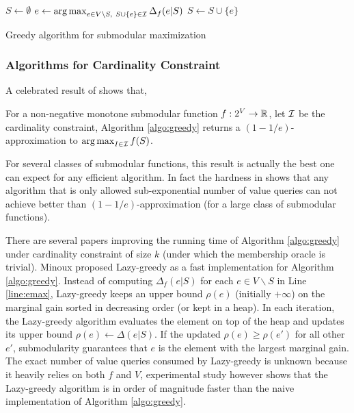 \begin{algorithm}[H]
\DontPrintSemicolon %
$S \gets \emptyset$\;
 {
  $e \gets \operatorname*{arg\,max}_{e\in V\backslash S, ~S\cup\{e\}\in \mathcal{I}} \Delta_f(e|S)$\;\label{line:emax}
  $S \gets S\cup \{e\}$\;
}
\;
\caption{{\sc Greedy} algorithm for submodular maximization}
\label{algo:greedy}
\end{algorithm}


\subsubsection{Algorithms for Cardinality Constraint}


A celebrated result of \cite{NWF78} shows that,
\begin{theorem}
  \label{thm:1978}
  For a non-negative monotone submodular function $f: 2^V \rightarrow \mathbb{R}$, let $\mathcal{I}$ be the cardinality constraint, Algorithm \ref{algo:greedy} returns a $(1 - 1/e)$-approximation to $\operatorname*{arg\,max}_{I\in \mathcal{I}} f(S)$.
\end{theorem}
For several classes of submodular functions, this result is actually the best one can expect for any efficient algorithm. In fact the hardness in \cite{NWF78,F98} shows that any algorithm that is only allowed sub-exponential number of value queries can not achieve better than $(1 - 1/e)$-approximation (for a large class of submodular functions).

There are several papers improving the running time of Algorithm \ref{algo:greedy} under cardinality constraint of size $k$ (under which the membership oracle is trivial). Minoux \cite{M78} proposed {\sc Lazy-greedy} as a fast implementation for Algorithm \ref{algo:greedy}. Instead of computing $\Delta_f(e|S)$ for each $e\in V\backslash S$ in Line \ref{line:emax},  {\sc Lazy-greedy} keeps an upper bound $\rho(e)$ (initially $+\infty$) on the marginal gain sorted in decreasing order (or kept in a heap). In each iteration, the {\sc Lazy-greedy} algorithm evaluates the element on top of the heap and updates its upper bound $\rho(e) \gets \Delta(e|S)$. If the updated $\rho(e) \geq \rho(e')$ for all other $e'$, submodularity guarantees that $e$ is the element with the largest marginal gain. The exact number of value queries consumed by {\sc Lazy-greedy} is unknown because it heavily relies on both $f$ and $V$, experimental study however shows that the {\sc Lazy-greedy} algorithm is in order of magnitude faster than the naive implementation of Algorithm \ref{algo:greedy}.  

